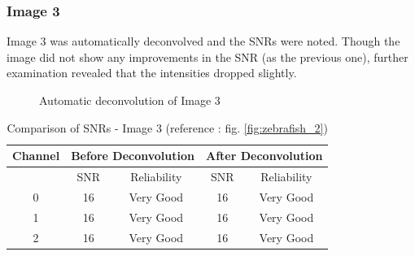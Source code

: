 \documentclass{article}
\begin{document}
\subsubsection*{Image 3}
Image 3 was automatically deconvolved and the SNRs were noted. Though the image did not show any improvements in the SNR (as the previous one), further examination revealed that the intensities dropped slightly. 
\begin{figure}[h!]
\centering
{}
\vspace{5 mm}
\caption{Automatic deconvolution of Image 3}
\label{fig:auto-deconvolve-image3}
\end{figure}
\begin{table}[h!]
\centering
\caption{Comparison of SNRs - Image 3 (reference : fig. \ref{fig:zebrafish_2})}
\begin{tabular}{*5c}
\toprule
Channel &  \multicolumn{2}{c}{Before Deconvolution} & \multicolumn{2}{c}{After Deconvolution}\\
\midrule
{}   & SNR   & Reliability    & SNR   & Reliability \\
0   &  16 & Very Good & 16 & Very Good \\
1   &  16 & Very Good & 16 & Very Good \\
2   &  16 & Very Good & 16 & Very Good \\
\bottomrule
\end{tabular}
\end{table}
\end{document}
